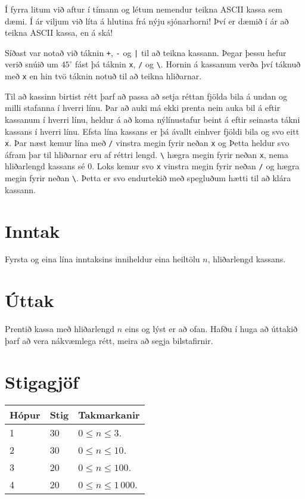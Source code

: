 
Í fyrra litum við aftur í tímann og létum nemendur teikna ASCII kassa sem dæmi.
Í ár viljum við líta á hlutina frá nýju sjónarhorni!
Því er dæmið í ár að teikna ASCII kassa, en á ská!

Síðast var notað við táknin \texttt{+}, \texttt{-} og \texttt{|} til að teikna kassann.
Þegar þessu hefur verið snúið um $45^\circ$ fást þá táknin \texttt{x}, \texttt{/} og \texttt{\textbackslash}.
Hornin á kassanum verða því táknuð með \texttt{x} en hin tvö táknin notuð til að teikna hliðarnar.

Til að kassinn birtist rétt þarf að passa að setja réttan fjölda bila á undan og milli stafanna í hverri línu.
Þar að auki má ekki prenta nein auka bil á eftir kassanum í hverri línu, heldur á að koma nýlínustafur beint á eftir
seinasta tákni kassans í hverri línu.
Efsta lína kassans er þá ávallt einhver fjöldi bila og svo eitt \texttt{x}.
Þar næst kemur lína með \texttt{/} vinstra megin fyrir neðan \texttt{x} og
Þetta heldur svo áfram þar til hliðarnar eru af réttri lengd.
\texttt{\textbackslash} hægra megin fyrir neðan \texttt{x}, nema hliðarlengd kassans sé $0$.
Loks kemur svo \texttt{x} vinstra megin fyrir neðan \texttt{/} og hægra megin fyrir neðan \texttt{\textbackslash}.
Þetta er svo endurtekið með spegluðum hætti til að klára kassann.

\section*{Inntak}
Fyrsta og eina lína inntaksins inniheldur eina heiltölu $n$, hliðarlengd kassans.

\section*{Úttak}
Prentið kassa með hliðarlengd $n$ eins og lýst er að ofan.
Hafðu í huga að úttakið þarf að vera nákvæmlega rétt, meira að segja bilstafirnir.

\section*{Stigagjöf}
\begin{tabular}{|l|l|l|}
\hline
Hópur & Stig & Takmarkanir \\ \hline
1     & 30   & $0 \leq n \leq 3$. \\ \hline
2     & 30   & $0 \leq n \leq 10$. \\ \hline
3     & 20   & $0 \leq n \leq 100$. \\ \hline
4     & 20   & $0 \leq n \leq 1\,000$. \\ \hline
\end{tabular}
